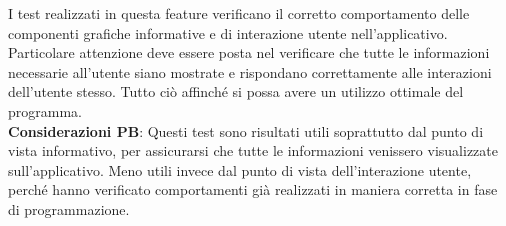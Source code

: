 \noindent I test realizzati in questa feature verificano il corretto comportamento delle componenti grafiche informative e di interazione utente nell'applicativo. Particolare attenzione deve essere posta nel verificare che tutte le informazioni necessarie all'utente siano mostrate e rispondano correttamente alle interazioni dell'utente stesso. Tutto ciò affinché si possa avere un utilizzo ottimale del programma.
\vspace{0.2cm} \\ \textbf{Considerazioni PB}: Questi test sono risultati utili soprattutto dal punto di vista informativo, per assicurarsi che tutte le informazioni venissero visualizzate sull'applicativo. Meno utili invece dal punto di vista dell'interazione utente, perché hanno verificato comportamenti già realizzati in maniera corretta in fase di programmazione.


